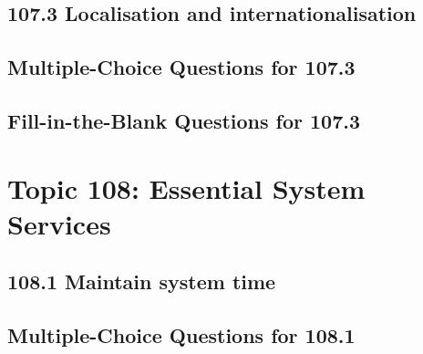 \documentclass[a4paper]{report}
\begin{document}
\newpage
\section*{107.3 Localisation and internationalisation}

\newpage
\section*{Multiple-Choice Questions for 107.3}

\newpage
\section*{Fill-in-the-Blank Questions for 107.3}


\newpage
\chapter{Topic 108: Essential System Services}

\newpage
\section*{108.1 Maintain system time}

\newpage
\section*{Multiple-Choice Questions for 108.1}

\newpage
\end{document}
